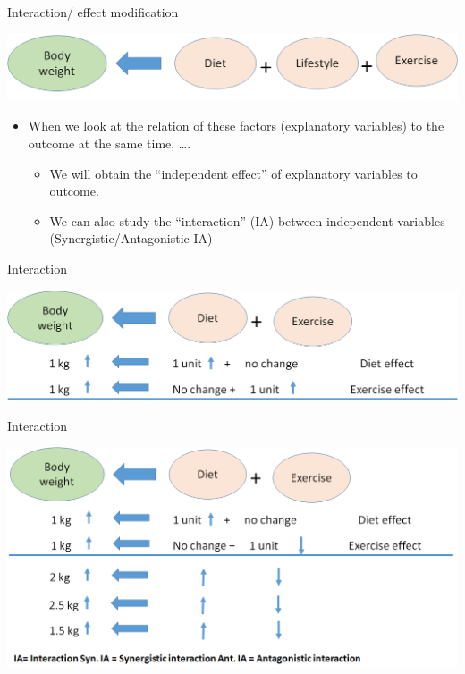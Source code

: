 \documentclass[ignorenonframetext,]{beamer}
\begin{document}
\begin{frame}{Interaction/ effect modification}

\includegraphics{lifestyle4.png}

\begin{itemize}
\itemsep1pt\parskip0pt
\item
  When we look at the relation of these factors (explanatory variables)
  to the outcome at the same time, \ldots{}.

  \begin{itemize}
  \itemsep1pt\parskip0pt
  \item
    We will obtain the ``independent effect'' of explanatory variables
    to outcome.
  \item
    We can also study the ``interaction'' (IA) between independent
    variables (Synergistic/Antagonistic IA)
  \end{itemize}
\end{itemize}

\end{frame}

\begin{frame}{Interaction}

\includegraphics{lifestyle5.png}

\end{frame}

\begin{frame}{Interaction}

\includegraphics{lifestyle6.png}

\end{frame}
\end{document}
